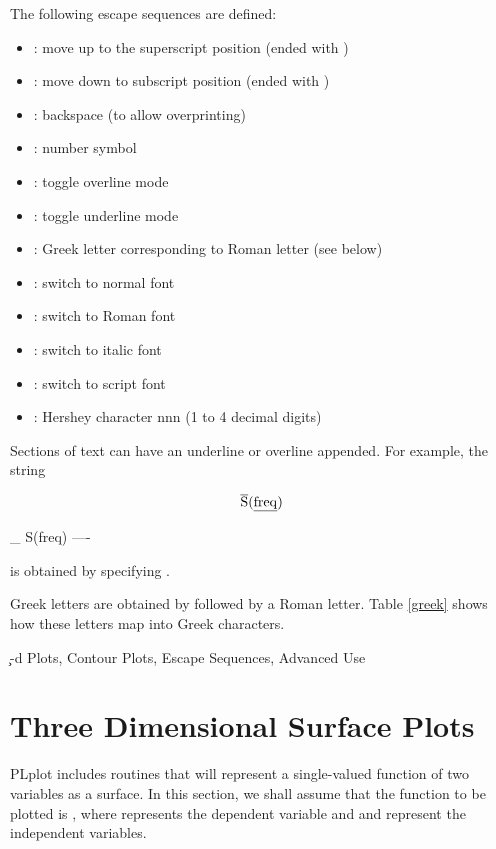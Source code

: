 The following escape sequences are defined:
\begin{itemize}
   \item {}: move up to the superscript position
    (ended with )
   \item {}: move down to subscript position
    (ended with )
   \item {}: backspace (to allow overprinting)
   \item \code{##}: number symbol
   \item \code{#+}: toggle overline mode
   \item \code{#-}: toggle underline mode
   \item {}: Greek letter corresponding to Roman letter 
                     (see below)
   \item {}: switch to normal font
   \item {}: switch to Roman font
   \item {}: switch to italic font
   \item {}: switch to script font
   \item {}: Hershey character nnn (1 to 4 decimal digits)
\end{itemize}

Sections of text can have an underline or overline appended.  For
example, the string
\begin{tex}
\[
{\rm\overline{S}(\underline{freq})}
\]
\end{tex}
\begin{ifinfo}
	_
	S(freq)
	  ----
\end{ifinfo}
is obtained by specifying .

Greek letters are obtained by  followed by a Roman letter.
Table \ref{greek} shows how these letters map into Greek
characters.
{}

\c %

-d Plots, Contour Plots, Escape Sequences, Advanced Use
\section{Three Dimensional Surface Plots}

PLplot includes routines that will represent a single-valued function of
two variables as a surface.  In this section, we shall assume that the
function to be plotted is , where  represents the
dependent variable and  and  represent the independent
variables.

